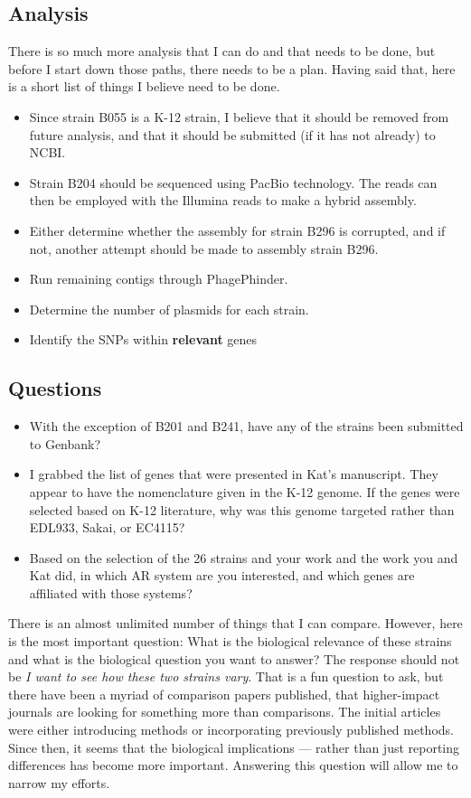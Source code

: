 \documentclass[11pt]{article}
\begin{document}
\subsection*{Analysis}
There is so much more analysis that I can do and that needs to be done, but before I start down those paths, there needs to be a plan. Having said that, here is a short list of things I believe need to be done.
\begin{itemize}
\item Since strain B055 is a K-12 strain, I believe that it should be removed from future analysis, and that it should be submitted (if it has not already) to NCBI. 
\item Strain B204 should be sequenced using PacBio technology. The reads can then be employed with the Illumina reads to make a hybrid assembly.
\item Either determine whether the assembly for strain B296 is corrupted, and if not, another attempt should be made to assembly strain B296.
\item Run remaining contigs through PhagePhinder.
\item Determine the number of plasmids for each strain.
\item Identify the SNPs within \textbf{relevant} genes
\end{itemize}

\subsection*{Questions}
\begin{itemize}
\item With the exception of B201 and B241, have any of the strains been submitted to Genbank?
\item I grabbed the list of genes that were presented in Kat's manuscript. They appear to have the nomenclature given in the K-12 genome. If the genes were selected based on K-12 literature, why was this genome targeted rather than EDL933, Sakai, or EC4115? 
\item Based on the selection of the 26 strains and your work and the work you and Kat did, in which AR system are you interested, and which genes are affiliated with those systems?
\end{itemize}

There is an almost unlimited number of things that I can compare. However, here is the most important question: What is the biological relevance of these strains and what is the biological question you want to answer? The response should not be \textit{I want to see how these two strains vary}. That is a fun question to ask, but there have been a myriad of comparison papers published, that higher-impact journals are looking for something more than comparisons. The initial articles were either introducing methods or incorporating previously published methods. Since then, it seems that the biological implications --- rather than just reporting differences has become more important. Answering this question will allow me to narrow my efforts.
\end{document}
